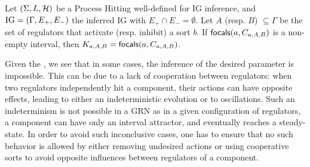 \begin{comment}
We pose $\PHh_{b,A,B}$ (\eqref{eq:param_h}) the set of actions in $\PHh$ that hit a process of sort $b$ and can be fired in the previously defined context. A process of sort $b$ can be reached if it belongs to the context or if it is a bounce in $\PHh_{b,A,B}$; we call $L_{b,A,B}^?$ (\ref{eq:param_candidates}) the set of such candidates. The set of focal processes $L_{b,A,B}^*$ (\ref{eq:param_focal}) is the set of processes of $L_{b,A,B}^?$ that are not hit by an action in $\PHh_{b,A,B}$.
\begin{align}
\label{eq:param_h}
  \PHh_{b,A,B} & = \{ \PHfrappe{a_i}{b_j}{b_k} \in \PHh \mid \exists a \in \Gamma, a_i \in C_{b,A,B}^a \wedge b_j \in C_{b,A,B}^b\}
\\
\label{eq:param_candidates}
  L_{b,A,B}^? & =  C_{b,A,B}^b \cup \{ b_k\mid \exists \PHfrappe{a_i}{b_j}{b_k} \in \PHh_{b,A,B}\}
\\
\label{eq:param_focal}
  L_{b,A,B}^* & =  L_{b,A,B}^? \setminus \{ b_j \mid \exists \PHfrappe{a_i}{b_j}{b_k} \in \PHh_{b,A,B} \}
\end{align}

The focal processes in $L_{b,A,B}^*$ are the wanted parameters if they are attractors, \ie if the actions in $\PHh_{b,A,B}$ can only bounce in their direction. A set of processes is an attractor if it verifies the condition (\ref{eq:param_attractor}); in this case, this set of processes is also an interval.
\begin{align}
\label{eq:param_attractor}
  \forall \PHfrappe{b_i}{a_j}{a_k} \in \PHh_{a,A,B}, \forall a_f \in L_{a,A,B}^*, |f-k| < |f-j|
\end{align}
\end{comment}


\begin{theorem}
\label{thm:param_K}
Let $(\Sigma, L, \mathcal{H})$ be a Process Hitting well-defined for IG inference, and $\mathrm{IG} = (\Gamma,
E_+, E_-)$ the inferred IG with $E_+\cap E_-=\emptyset$.
Let $A$ (resp. $B$) $\subseteq \Gamma$ be the set of regulators that activate (resp. inhibit) a sort
$b$.
If $\mathsf{focals}(a,C_{a,A,B})$ is a non-empty interval, then $K_{a,A,B} = \mathsf{focals}(a, C_{a,A,B})$.
\end{theorem}


Given the , we see that in some cases, the inference of the desired parameter is impossible. This can be due to a lack of cooperation between regulators: when two regulators independently hit a component, their actions can have opposite effects, leading to either an indeterministic evolution or to oscillations. Such an indeterminism is not possible in a GRN as in a given configuration of regulators, a component can have only an interval attractor, and eventually reaches a steady-state. In order to avoid such inconclusive cases, one has to ensure that no such behavior is allowed by either removing undesired actions or using cooperative sorts to avoid opposite influences between regulators of a component.

